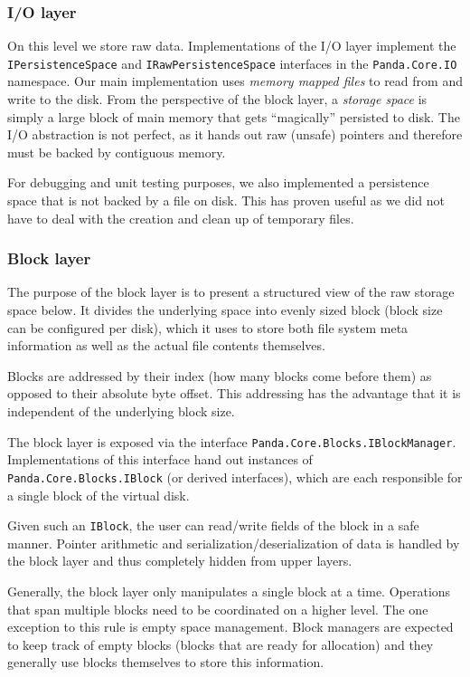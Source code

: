 \documentclass[a4paper,12pt]{article}
\begin{document}
\subsubsection{I/O layer}

On this level we store raw data. Implementations of the I/O layer implement the \texttt{IPersistenceSpace} and \texttt{IRawPersistenceSpace} interfaces in the \texttt{Panda.Core.IO} namespace. 
Our main implementation uses \emph{memory mapped files} to read from and write to the disk.
From the perspective of the block layer, a \emph{storage space} is simply a large block of main memory that gets ``magically'' persisted to disk.
The I/O abstraction is not perfect, as it hands out raw (unsafe) pointers and therefore must be backed by contiguous memory.

For debugging and unit testing purposes, we also implemented a persistence space that is not backed by a file on disk.
This has proven useful as we did not have to deal with the creation and clean up of temporary files.

\subsubsection{Block layer}

The purpose of the block layer is to present a structured view of the raw storage space below. 
It divides the underlying space into evenly sized block (block size can be configured per disk), which it uses to store both file system meta information as well as the actual file contents themselves.

Blocks are addressed by their index (how many blocks come before them) as opposed to their absolute byte offset.
This addressing has the advantage that it is independent of the underlying block size. 

The block layer is exposed via the interface \texttt{Panda.Core.Blocks.IBlockManager}.
Implementations of this interface hand out instances of \texttt{Panda.Core.Blocks.IBlock} (or derived interfaces), which are each responsible for a single block of the virtual disk.

Given such an \texttt{IBlock}, the user can read/write fields of the block in a safe manner. 
Pointer arithmetic and serialization/deserialization of data is handled by the block layer and thus completely hidden from upper layers.

Generally, the block layer only manipulates a single block at a time.
Operations that span multiple blocks need to be coordinated on a higher level.
The one exception to this rule is empty space management.
Block managers are expected to keep track of empty blocks (blocks that are ready for allocation) and they generally use blocks themselves to store this information. 
\end{document}
